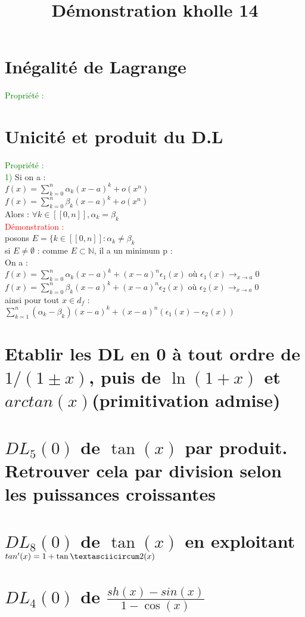 \documentclass{article}
\begin{document}
\title{Démonstration kholle 14}
\date{}
\maketitle
	\renewcommand{\thesection}{\Roman{section}}
	\setlength{\parindent}{1.5cm}
\section{Inégalité de Lagrange} 
\textcolor{green}{Propriété :} \\ 

\section{Unicité et produit du D.L}
\textcolor{green}{Propriété :} \\ 
\textcolor{green}{1)} Si on a : \\ 
$f(x)=\sum_{k=0}^n \alpha_k(x-a)^k+o(x^n)$  \\
$f(x)= \sum_{k=0}^n \beta_k(x-a)^k + o(x^n)$ \\ 
Alors : $ \forall k \in [[0,n]], \alpha_k=\beta_k$ \\ 
\textcolor{red}{Démonstration : } \\ 
posons $E= \lbrace k \in [[0,n]]: \alpha_k \neq \beta_k$ \\
si $E \neq \emptyset$ : comme $E\subset \mathbb{N}$, il a un minimum p : \\ 
On a :\\ 
$f(x)= \sum_{k=0}^n \alpha_k (x-a)^k + (x-a)^n \epsilon_1(x)$ où $ \epsilon_1(x) \rightarrow_{x\rightarrow a} 0$ \\ 
$f(x)= \sum_{k=0}^n \beta_k (x-a)^k + (x-a)^n \epsilon_2(x)$ où $\epsilon_2(x) \rightarrow_{x \rightarrow a} 0$ \\ 
ainsi pour tout $x \in d_f$ : \\ 
$\sum_{k=1}^n(\alpha_k- \beta_k) (x-a)^k+ (x-a)^n (\epsilon_1(x) - \epsilon_2(x)) $
\section{Etablir les DL en 0 à tout ordre de $1/(1\pm x)$, puis de $\ln(1+x)$ et $arctan(x)$(primitivation admise)}
\section{$DL_5(0)$ de $\tan(x)$ par produit. Retrouver cela par division selon les puissances croissantes}
\section{$DL_8(0)$ de $\tan(x)$ en exploitant $tan'(x)=1+\tanˆ2(x)$}
\section{$DL_4(0)$ de $\frac{sh(x)-sin(x)}{1-\cos(x)}$}
\end{document}
